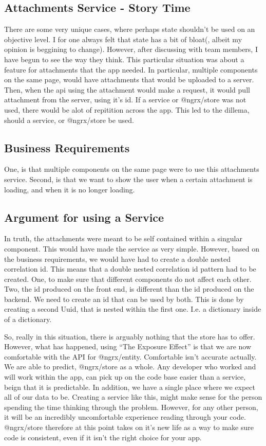 \subsection{ Attachments Service - Story Time }
There are some very unique cases, where perhaps state shouldn't be used on an
objective level. I for one always felt that state has a bit of bloat(, albeit my
opinion is beggining to change). However, after discussing with team members,
I have begun to see the way they think. This particular situation was about a
feature for attachments that the app needed. In particular, multiple components
on the same page, would have attachments that would be uploaded to a server.
Then, when the api using the attachment would make a request, it would pull
attachment from the server, using it's id. If a service or @ngrx/store was not
used, there would be alot of repitition across the app. This led to the dillema,
should a service, or @ngrx/store be used.

\subsection{ Business Requirements }
One, is that multiple components on the same page were to use this attachments
service. Second, is that we want to show the user when a certain attachment is
loading, and when it is no longer loading.

\subsection{ Argument for using a Service }
In truth, the attachments were meant to be self contained within a singular
component. This would have made the service as very simple. However, based on
the business requirements, we would have had to create a double nested
correlation id. This means that a double nested correlation id pattern had to be
created. One, to make sure that different components do not affect each other.
Two, the id produced on the front end, is different than the id produced on the
backend. We need to create an id that can be used by both. This is done by
creating a second Uuid, that is nested within the first one. I.e. a dictionary
inside of a dictionary.

So, really in this situation, there is arguably nothing that the store has to
offer. However, what has happened, using ``The Exposure Effect'' is that we are
now comfortable with the API for @ngrx/entity. Comfortable isn't accurate
actually. We are able to predict, @ngrx/store as a whole. Any developer who
worked and will work within the app, can pick up on the code base easier than
a service, beign that it is predictable. In addition, we have a single place
where we expect all of our data to be. Creating a service like this, might make
sense for the person spending the time thinking through the problem. However,
for any other person, it will be an incredibly uncomfortable experience reading
through your code. @ngrx/store therefore at this point takes on it's new life
as a way to make sure code is consistent, even if it isn't the right choice for
your app.

